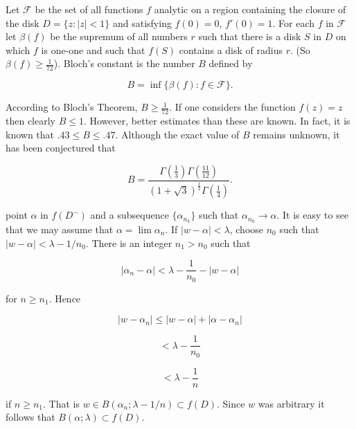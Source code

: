 Let $\mathcal{F}$ be the set of all functions $f$ analytic on a region containing the closure of the disk $D = \{z: |z| < 1\}$ and satisfying $f(0) = 0$, $f'(0) = 1$. For each $f$ in $\mathcal{F}$ let $\beta(f)$ be the supremum of all numbers $r$ such that there is a disk $S$ in $D$ on which $f$ is one-one and such that $f(S)$ contains a disk of radius $r$. (So $\beta(f) \geq \frac{1}{72}$). Bloch's constant is the number $B$ defined by

$$B = \inf \{ \beta(f) : f \in \mathcal{F} \}.$$

According to Bloch's Theorem, $B \geq \frac{1}{72}$. If one considers the function $f(z) = z$ then clearly $B \leq 1$. However, better estimates than these are known. In fact, it is known that $.43 \leq B \leq .47$. Although the exact value of $B$ remains unknown, it has been conjectured that

$$B = \frac{\Gamma\left(\frac{1}{3}\right) \Gamma\left(\frac{11}{12}\right)}{(1 + \sqrt{3})^{\frac{1}{2}} \Gamma\left(\frac{1}{4}\right)}.$$

point $\alpha$ in $f(D^-)$ and a subsequence $\{\alpha_{n_k}\}$ such that $\alpha_{n_k} \to \alpha$. It is easy to see that we may assume that $\alpha = \lim \alpha_n$. If $|w - \alpha| < \lambda$, choose $n_0$ such that $|w - \alpha| < \lambda - 1/n_0$. There is an integer $n_1 > n_0$ such that

$$|\alpha_n - \alpha| < \lambda - \frac{1}{n_0} - |w - \alpha|$$

for $n \geq n_1$. Hence

$$|w - \alpha_n| \leq |w - \alpha| + |\alpha - \alpha_n|$$

$$< \lambda - \frac{1}{n_0}$$

$$< \lambda - \frac{1}{n}$$

if $n \geq n_1$. That is $w \in B(\alpha_n; \lambda - 1/n) \subset f(D)$. Since $w$ was arbitrary it follows that $B(\alpha; \lambda) \subset f(D)$.